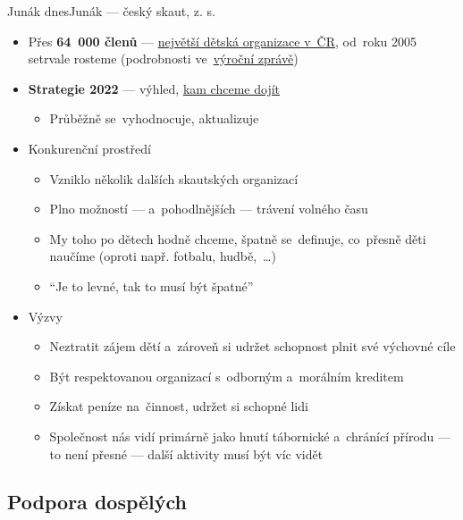 \documentclass[compress, ucs, xelatex, 11pt, xcolor=dvipsnames, print,
	hyperref={
		bookmarks=true,
		unicode=true,
		colorlinks=true,
		pdftitle={Skautska vychovna metoda},
		plainpages=false,
		pdfauthor={Vojtech Zeisek},
		pdfsubject={Skautska vychovna metoda a jeji vyvoj za posledni stoleti a desetileti},
		pdfcreator={XeLaTeX},
		pdfkeywords={Junak, Pedagogika, Skaut, Skauting, Vychovna metoda},
		linkcolor=Black,
		anchorcolor=Black,
		citecolor=OliveGreen,
		filecolor=OliveGreen,
		menucolor=Black,
		urlcolor=OliveGreen,
		pdftex},
	url={hyphens, lowtilde} %
	]{beamer}
\begin{document}
\begin{frame}{Junák dnes}{Junák --- český skaut, z. s.}
	\begin{itemize}
		\item Přes \textbf{64~000 členů} --- \href{https://www.skaut.cz/skauting/}{největší dětská organizace v~ČR}, od~roku 2005 setrvale rosteme (podrobnosti ve~\href{https://krizovatka.skaut.cz/stredisko/propagace/propagacni-materialy/vyrocni-zpravy/1002-vyrocni-zpravy}{výroční zprávě})
		\item \textbf{Strategie 2022} --- výhled, \href{https://krizovatka.skaut.cz/organizace/ustredi/strategie2022}{kam chceme dojít}
		\begin{itemize}
			\item Průběžně se~vyhodnocuje, aktualizuje
		\end{itemize}
		\item Konkurenční prostředí
		\begin{itemize}
			\item Vzniklo několik dalších skautských organizací
			\item Plno možností --- a~pohodlnějších --- trávení volného času
			\item My toho po dětech hodně chceme, špatně se~definuje, co~přesně děti naučíme (oproti např. fotbalu, hudbě,~\ldots)
			\item \enquote{Je to levné, tak to musí být špatné}
		\end{itemize}
		\item Výzvy
		\begin{itemize}
			\item Neztratit zájem dětí a~zároveň si udržet schopnost plnit své výchovné cíle
			\item Být respektovanou organizací s~odborným a~morálním kreditem
			\item Získat peníze na~činnost, udržet si schopné lidi
			\item Společnost nás vidí primárně jako hnutí tábornické a~chránící přírodu --- to není přesné --- další aktivity musí být víc vidět
		\end{itemize}
	\end{itemize}
\end{frame}

\subsection{Podpora dospělých}
\end{document}
